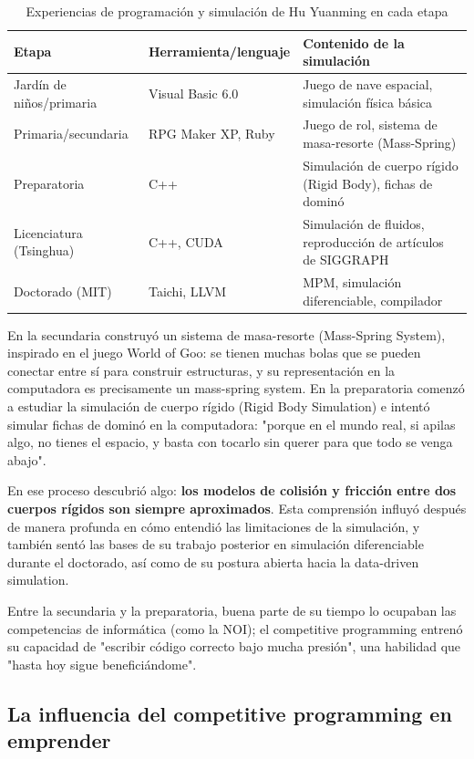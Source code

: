 \begin{table}[H]
\centering
\caption{Experiencias de programación y simulación de Hu Yuanming en cada etapa}
\begin{tabular}{lll}
\toprule
\textbf{Etapa} & \textbf{Herramienta/lenguaje} & \textbf{Contenido de la simulación} \\
\midrule
Jardín de niños/primaria & Visual Basic 6.0 & Juego de nave espacial, simulación física básica \\
Primaria/secundaria & RPG Maker XP, Ruby & Juego de rol, sistema de masa-resorte (Mass-Spring) \\
Preparatoria & C++ & Simulación de cuerpo rígido (Rigid Body), fichas de dominó \\
Licenciatura (Tsinghua) & C++, CUDA & Simulación de fluidos, reproducción de artículos de SIGGRAPH \\
Doctorado (MIT) & Taichi, LLVM & MPM, simulación diferenciable, compilador \\
\bottomrule
\end{tabular}
\end{table}

En la secundaria construyó un sistema de masa-resorte (Mass-Spring System), inspirado en el juego World of Goo: se tienen muchas bolas que se pueden conectar entre sí para construir estructuras, y su representación en la computadora es precisamente un mass-spring system. En la preparatoria comenzó a estudiar la simulación de cuerpo rígido (Rigid Body Simulation) e intentó simular fichas de dominó en la computadora: "porque en el mundo real, si apilas algo, no tienes el espacio, y basta con tocarlo sin querer para que todo se venga abajo".

En ese proceso descubrió algo: \textbf{los modelos de colisión y fricción entre dos cuerpos rígidos son siempre aproximados}. Esta comprensión influyó después de manera profunda en cómo entendió las limitaciones de la simulación, y también sentó las bases de su trabajo posterior en simulación diferenciable durante el doctorado, así como de su postura abierta hacia la data-driven simulation.

Entre la secundaria y la preparatoria, buena parte de su tiempo lo ocupaban las competencias de informática (como la NOI); el competitive programming entrenó su capacidad de "escribir código correcto bajo mucha presión", una habilidad que "hasta hoy sigue beneficiándome".

\subsection{La influencia del competitive programming en emprender}

